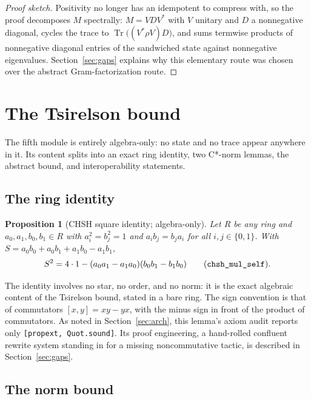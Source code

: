 \documentclass[11pt]{article}
\renewcommand{\_}{\textunderscore\allowbreak}
\newtheorem{proposition}{Proposition}
\theoremstyle{remark}
\newcommand{\Tr}{\operatorname{Tr}}
\begin{document}
\begin{proof}[Proof sketch]
Positivity no longer has an idempotent to compress with, so the proof decomposes $M$ spectrally: $M = V D V^{*}$ with $V$ unitary and $D$ a nonnegative diagonal, cycles the trace to $\Tr\bigl((V^{*} \rho V) D\bigr)$, and sums termwise products of nonnegative diagonal entries of the sandwiched state against nonnegative eigenvalues. Section~\ref{sec:gaps} explains why this elementary route was chosen over the abstract Gram-factorization route.
\end{proof}

\section{The Tsirelson bound}
\label{sec:tsirelson}

The fifth module is entirely algebra-only: no state and no trace appear anywhere in it. Its content splits into an exact ring identity, two C*-norm lemmas, the abstract bound, and interoperability statements.

\subsection{The ring identity}

\begin{proposition}[CHSH square identity; algebra-only]
\label{prop:ring-identity}
Let $R$ be any ring and $a_0, a_1, b_0, b_1 \in R$ with $a_i^2 = b_j^2 = 1$ and $a_i b_j = b_j a_i$ for all $i, j \in \{0,1\}$. With $S = a_0 b_0 + a_0 b_1 + a_1 b_0 - a_1 b_1$,
\[
S^2 = 4 \cdot 1 - (a_0 a_1 - a_1 a_0)(b_0 b_1 - b_1 b_0)
\qquad (\texttt{chsh\_mul\_self}).
\]
\end{proposition}

The identity involves no star, no order, and no norm: it is the exact algebraic content of the Tsirelson bound, stated in a bare ring. The sign convention is that of commutators $[x,y] = xy - yx$, with the minus sign in front of the product of commutators. As noted in Section~\ref{sec:arch}, this lemma's axiom audit reports only \texttt{[propext, Quot.sound]}. Its proof engineering, a hand-rolled confluent rewrite system standing in for a missing noncommutative tactic, is described in Section~\ref{sec:gaps}.

\subsection{The norm bound}
\end{document}
